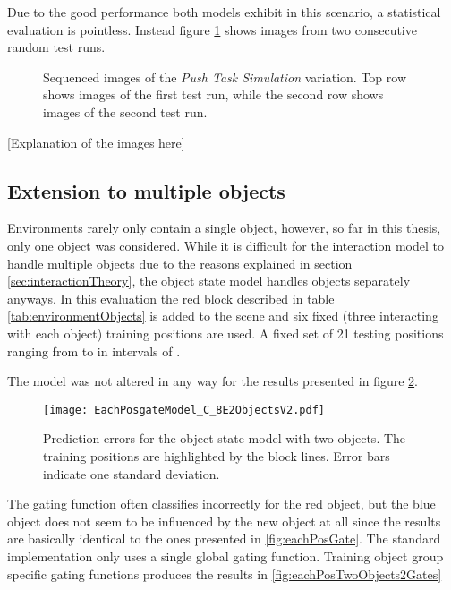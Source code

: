 Due to the good performance both models exhibit in this scenario, a statistical evaluation is pointless. Instead figure \ref{fig:pushTaskSim2} shows images from two consecutive random test runs. %

\begin{figure}
\centering
\caption{Sequenced images of the \textit{Push Task Simulation} variation. Top row shows images of the first test run, while the second row shows images of the second test run.}
\label{fig:pushTaskSim2}
\end{figure}

[Explanation of the images here]

\subsection{Extension to multiple objects \label{sec:multipleObjects}}

Environments rarely only contain a single object, however, so far in this thesis, only one object was considered. While it is difficult for the interaction model to handle multiple objects due to the reasons explained in section \ref{sec:interactionTheory}, the object state model handles objects separately anyways. In this evaluation the red block described in table \ref{tab:environmentObjects} is added to the scene and six fixed (three interacting with each object) training positions are used. 
A fixed set of 21 testing positions ranging from  to  in intervals of .

The model was not altered in any way for the results presented in figure \ref{fig:eachPosTwoObjects}.

\begin{figure}
\centering
\texttt{[image: EachPosgateModel\_C\_8E2ObjectsV2.pdf]}
\caption{Prediction errors for the object state model with two objects. The training positions are highlighted by the block lines. Error bars indicate one standard deviation.}
\label{fig:eachPosTwoObjects}
\end{figure}

The gating function often classifies incorrectly for the red object, but the blue object does not seem to be influenced by the new object at all since the results are basically identical to the ones presented in \ref{fig:eachPosGate}.
The standard implementation only uses a single global gating function. Training object group specific gating functions produces the results in \ref{fig:eachPosTwoObjects2Gates}

